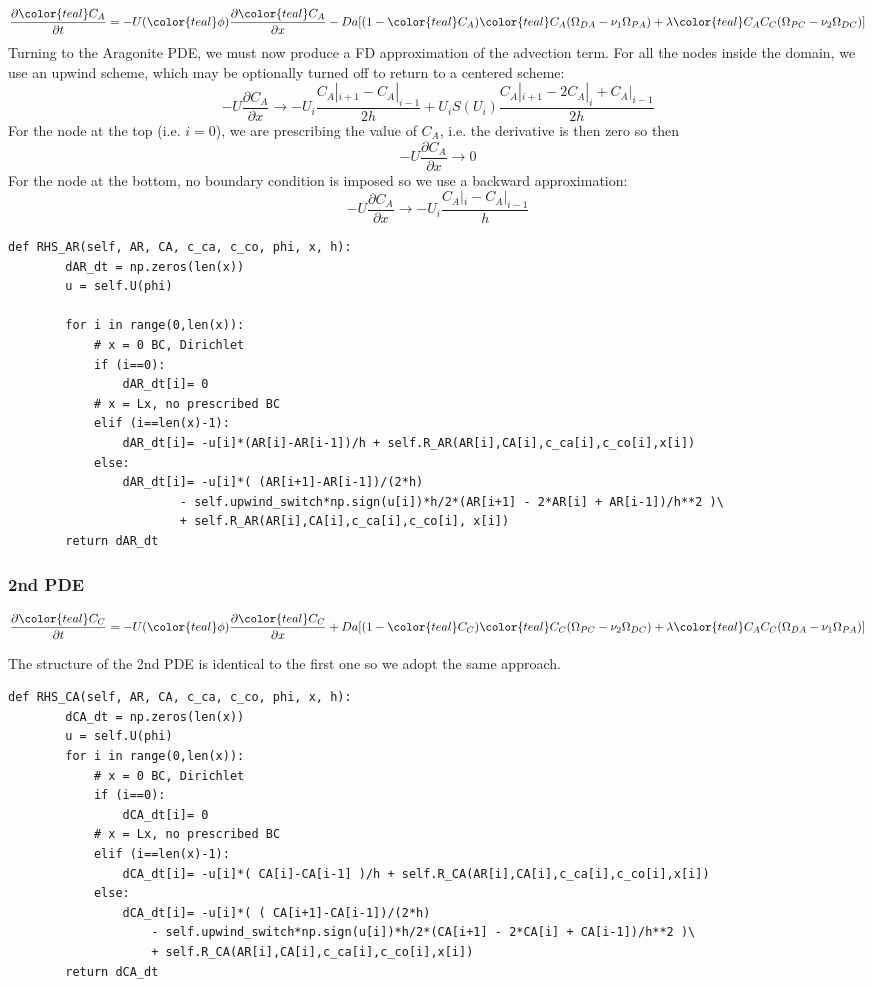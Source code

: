 \documentclass[a4paper]{article}
\begin{document}
\[
\frac{\partial {\color{teal} C_A}}{\partial t} 
= -U({\color{teal}\phi}) \frac{\partial {\color{teal}C_A}}{\partial x} 
- Da[(1-{\color{teal}C_A}){\color{teal}C_A}(\Omega_{DA}-\nu_1\Omega_{PA})+
\lambda {\color{teal}C_AC_C} (\Omega_{PC}-\nu_2\Omega_{DC})]
\]
Turning to the Aragonite PDE, we must now produce a FD approximation of the advection term.
For all the nodes inside the domain, we use an upwind scheme, which may be optionally turned off to return to a centered scheme:
\[
-U \frac{\partial C_A}{\partial x} \rightarrow -U_i \frac{C_A|_{i+1} -C_A|_{i-1}}{2h} + U_i S(U_i) \frac{C_A|_{i+1} - 2C_A|_{i} +C_A|_{i-1}}{2h}
\]
For the node at the top (i.e. $i=0$), we are prescribing the value of $C_A$, i.e.
the derivative is then zero so then 
\[
-U \frac{\partial C_A}{\partial x} \rightarrow 0 
\]
For the node at the bottom, no boundary condition is imposed so we use a backward
approximation:
\[
-U \frac{\partial C_A}{\partial x} \rightarrow -U_i \frac{C_A|_{i} -C_A|_{i-1}}{h}
\]
 
\begin{lstlisting}
def RHS_AR(self, AR, CA, c_ca, c_co, phi, x, h):
        dAR_dt = np.zeros(len(x))
        u = self.U(phi)
        
        for i in range(0,len(x)):
            # x = 0 BC, Dirichlet
            if (i==0):
                dAR_dt[i]= 0
            # x = Lx, no prescribed BC
            elif (i==len(x)-1):
                dAR_dt[i]= -u[i]*(AR[i]-AR[i-1])/h + self.R_AR(AR[i],CA[i],c_ca[i],c_co[i],x[i])
            else:
                dAR_dt[i]= -u[i]*( (AR[i+1]-AR[i-1])/(2*h) 
                        - self.upwind_switch*np.sign(u[i])*h/2*(AR[i+1] - 2*AR[i] + AR[i-1])/h**2 )\
                        + self.R_AR(AR[i],CA[i],c_ca[i],c_co[i], x[i])    
        return dAR_dt
\end{lstlisting}

\subsubsection*{2nd PDE}
\[
\frac{\partial {\color{teal}C_C}}{\partial t} 
= -U({\color{teal}\phi}) \frac{\partial {\color{teal}C_C}}{\partial x}  
+ Da[(1-{\color{teal}C_C}){\color{teal}C_C}(\Omega_{PC}-\nu_2\Omega_{DC})+
\lambda {\color{teal}C_AC_C} (\Omega_{DA}-\nu_1\Omega_{PA})]
\]

The structure of the 2nd PDE is identical to the first 
one so we adopt the same approach.

\begin{lstlisting}
def RHS_CA(self, AR, CA, c_ca, c_co, phi, x, h):
        dCA_dt = np.zeros(len(x))
        u = self.U(phi)
        for i in range(0,len(x)):
            # x = 0 BC, Dirichlet
            if (i==0):
                dCA_dt[i]= 0
            # x = Lx, no prescribed BC
            elif (i==len(x)-1):
                dCA_dt[i]= -u[i]*( CA[i]-CA[i-1] )/h + self.R_CA(AR[i],CA[i],c_ca[i],c_co[i],x[i])
            else:
                dCA_dt[i]= -u[i]*( ( CA[i+1]-CA[i-1])/(2*h) 
                    - self.upwind_switch*np.sign(u[i])*h/2*(CA[i+1] - 2*CA[i] + CA[i-1])/h**2 )\
                    + self.R_CA(AR[i],CA[i],c_ca[i],c_co[i],x[i])
        return dCA_dt
\end{lstlisting}
\end{document}
